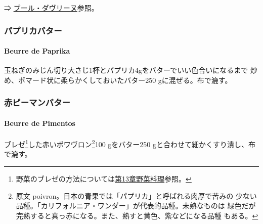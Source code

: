 \begin{recette}
⇒ \protect\hyperlink{beurre-d-aveline}{ブール・ダヴリーヌ}参照。

\maeaki

\hypertarget{ux30d1ux30d7ux30eaux30abux30d0ux30bfux30fc}{%
\subsubsection{パプリカバター}\label{ux30d1ux30d7ux30eaux30abux30d0ux30bfux30fc}}

\hypertarget{beurre-de-paprika}{%
\paragraph{Beurre de Paprika}\label{beurre-de-paprika}}


玉ねぎのみじん切り大さじ1杯とパプリカ4gをバターでいい色合いになるまで
炒め、ポマード状に柔らかくしておいたバター250 gに混ぜる。布で漉す。

\maeaki

\hypertarget{ux8d64ux30d4ux30fcux30deux30f3ux30d0ux30bfux30fc}{%
\subsubsection{赤ピーマンバター}\label{ux8d64ux30d4ux30fcux30deux30f3ux30d0ux30bfux30fc}}

\hypertarget{beurre-de-pimentos}{%
\paragraph{Beurre de Pimentos}\label{beurre-de-pimentos}}


ブレゼ\footnote{野菜のブレゼの方法については\protect\hyperlink{}{第13章野菜料理}参照。}した赤いポワヴロン\footnote{原文
  poivron。日本の青果では「パプリカ」と呼ばれる肉厚で苦みの
  少ない品種。「カリフォルニア・ワンダー」が代表的品種。未熟なものは
  緑色だが完熟すると真っ赤になる。また、熟すと黄色、紫などになる品種
  もある。}100 gをバター250 gと合わせて細かくすり潰し、布で漉す。


\end{recette}
